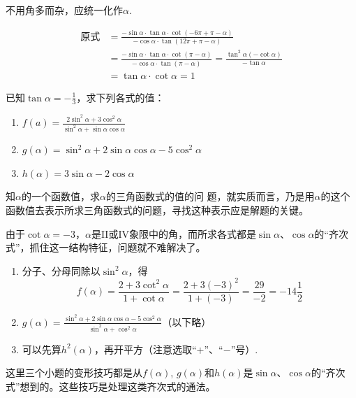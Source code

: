 \begin{analyze}
不用角多而杂，应统一化作$\alpha$.
\end{analyze}

\begin{solution}
\[\begin{split}
\text{原式}&=\frac{-\sin\alpha \cdot \tan\alpha\cdot \cot(-6\pi+\pi-\alpha)}{-\cos\alpha\cdot \tan(12\pi+\pi-\alpha)}\\
&=\frac{-\sin\alpha \cdot \tan\alpha\cdot \cot (\pi-\alpha)}{-\cos\alpha\cdot \tan(\pi-\alpha)}=\frac{\tan^2\alpha (-\cot\alpha)}{-\tan\alpha}\\
&=\tan\alpha\cdot \cot\alpha =1
\end{split}\]
\end{solution}

\begin{example}
已知$\tan\alpha=-\frac{1}{3}$，求下列各式的值：
\begin{enumerate}[(1)]
    \item $f(a)=\frac{2\sin^2\alpha+3\cos^2\alpha}{\sin^2\alpha+\sin\alpha\cos\alpha}$
    \item $g(\alpha)=\sin^2\alpha+2\sin\alpha\cos\alpha-5\cos^2\alpha$
    \item $h(\alpha)=3\sin\alpha-2\cos\alpha$
\end{enumerate}
\end{example}

\begin{analyze}
知$\alpha$的一个函数值，求$\alpha$的三角函数式的值的问
    题，就实质而言，乃是用$\alpha$的这个函数值去表示所求三角函数式的问题，寻找这种表示应是解题的关键。

    由于$\cot\alpha=-3$，$\alpha$是II或IV象限中的角，而所求各式都是$\sin\alpha$、$\cos\alpha$的“齐次式”，抓住这一结构特征，问题就不难解决了。

\begin{enumerate}[(1)]
    \item    分子、分母同除以$\sin^2\alpha$，得
\[f(\alpha)=\frac{2+3\cot^2\alpha}{1+\cot\alpha}=\frac{2+3(-3)^2}{1+(-3)}=\frac{29}{-2}=-14\frac{1}{2}\]
\item $g(\alpha)=\frac{\sin^2\alpha+2\sin\alpha\cos\alpha-5\cos^2\alpha}{\sin^2\alpha+\cos^2\alpha}$（以下略）
\item 可以先算$h^2(\alpha)$，再开平方（注意选取“$+$”、“$-$”号）.
\end{enumerate}
\end{analyze}

\begin{remark}
这里三个小题的变形技巧都是从$f(\alpha)$, $g(\alpha)$和$h(\alpha)$是$\sin\alpha$、$\cos\alpha$的“齐次式”想到的。这些技巧是处理这类齐次式的通法。
\end{remark}

